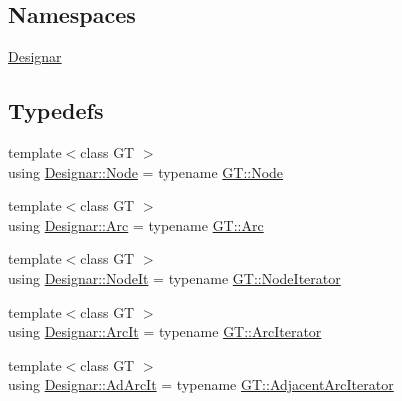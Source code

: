 \subsection*{Namespaces}
\begin{DoxyCompactItemize}
\item 
 \hyperlink{namespace_designar}{Designar}
\end{DoxyCompactItemize}
\subsection*{Typedefs}
\begin{DoxyCompactItemize}
\item 
{\footnotesize template$<$class GT $>$ }\\using \hyperlink{namespace_designar_a5af326c65aa2bd26b26c410f2030d09e}{Designar\+::\+Node} = typename \hyperlink{class_designar_1_1_graph_a5dfc7dba9d092ac489c72e40390c37d0}{G\+T\+::\+Node}
\item 
{\footnotesize template$<$class GT $>$ }\\using \hyperlink{namespace_designar_a3f55fb5513d62ff47cbc8f72b8e95d6f}{Designar\+::\+Arc} = typename \hyperlink{class_designar_1_1_graph_a74c730ef4ce2d20f998d72bd25c2b5bf}{G\+T\+::\+Arc}
\item 
{\footnotesize template$<$class GT $>$ }\\using \hyperlink{namespace_designar_a5fdef28ed7c6b948482379ebabf927ce}{Designar\+::\+Node\+It} = typename \hyperlink{class_designar_1_1_graph_1_1_node_iterator}{G\+T\+::\+Node\+Iterator}
\item 
{\footnotesize template$<$class GT $>$ }\\using \hyperlink{namespace_designar_a30ebaaade3ffa312c33d6e1234a96952}{Designar\+::\+Arc\+It} = typename \hyperlink{class_designar_1_1_graph_1_1_arc_iterator}{G\+T\+::\+Arc\+Iterator}
\item 
{\footnotesize template$<$class GT $>$ }\\using \hyperlink{namespace_designar_a88b020661576bc09a536766283ec1790}{Designar\+::\+Ad\+Arc\+It} = typename \hyperlink{class_designar_1_1_graph_1_1_adjacent_arc_iterator}{G\+T\+::\+Adjacent\+Arc\+Iterator}
\end{DoxyCompactItemize}
